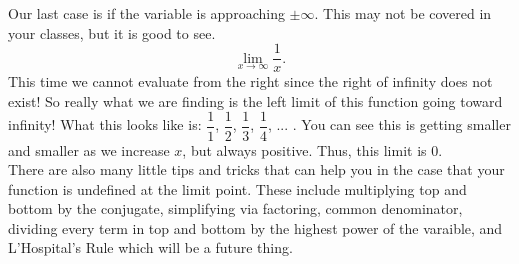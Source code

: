 \documentclass[10pt]{article}
\theoremstyle{Theorem}
\theoremstyle{definition}
\theoremstyle{remark}
\theoremstyle{custom}
\begin{document}
Our last case is if the variable is approaching $\pm \infty$.  This may not be covered in your classes, but it is good to see. 
$$\lim_{x\rightarrow \infty} \dfrac{1}{x}.$$
This time we cannot evaluate from the right since the right of infinity does not exist! So really what we are finding is the left limit of this function going toward infinity! What this looks like is: $\dfrac{1}{1}$, $\dfrac{1}{2}$, $\dfrac{1}{3}$, $\dfrac{1}{4}$, ... .  You can see this is getting smaller and smaller as we increase $x$, but always positive. Thus, this limit is 0.\\
There are also many little tips and tricks that can help you in the case that your function is undefined at the limit point. These include multiplying top and bottom by the conjugate, simplifying via factoring, common denominator, dividing every term in top and bottom by the highest power of the varaible, and L'Hospital's Rule which will be a future thing.\\
\end{document}
